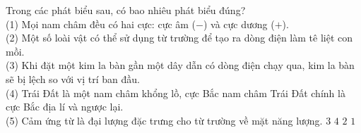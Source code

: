 	\begin{ex}%
		Trong các phát biểu sau, có bao nhiêu phát biểu đúng?\\
		(1) Mọi nam châm đều có hai cực: cực âm ($-$) và cực dương ($+$).\\
		(2) Một số loài vật có thể sử dụng từ trường để tạo ra dòng điện làm tê liệt con mồi.\\
		(3) Khi đặt một kim la bàn gần một dây dẫn có dòng điện chạy qua, kim la bàn sẽ bị lệch so với vị trí ban đầu.\\
		(4) Trái Đất là một nam châm khổng lồ, cực Bắc nam châm Trái Đất chính là cực Bắc địa lí và ngược lại.\\
		(5) Cảm ứng từ là đại lượng đặc trưng cho từ trường về mặt năng lượng.
		\choice
		{$3$}
		{$4$}
		{$2$}
		{\True $1$}
	\end{ex}

